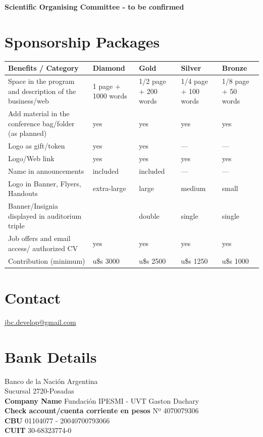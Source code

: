 \documentclass[11pt,a4paper]{report}
\begin{document}
\textbf{Scientific Organising Committee - to be confirmed}

\section*{Sponsorship Packages}
\begin{center}

\begin{tabular}{|p{4cm}|p{2.5cm}|p{2.5cm}|p{2.5cm}|p{2.5cm}|}
\hline
Benefits / Category & Diamond & Gold  & Silver & Bronze \\
\hline
Space in the program and description of the business/web & 1 page +
1000 words & 1/2 page + 200 words & 1/4 page + 100 words &  1/8 page +
50 words\\
\hline
Add material in the conference bag/folder (as planned) & yes & yes & yes & yes \\
\hline
Logo as gift/token & yes & yes & --- & --- \\
\hline
Logo/Web link  & yes & yes & yes & yes \\
\hline
Name in announcements & included & included & --- & --- \\
\hline
Logo in Banner, Flyers, Handouts & extra-large & large & medium & small \\
\hline
Banner/Insignia displayed in auditorium triple & & double & single & single \\
\hline
Job offers and email access/ authorized CV  & yes & yes & yes & yes \\
\hline
Contribution (minimum) & u\$s 3000 & u\$s 2500 & u\$s 1250 & u\$s 1000\\
\hline
\end{tabular}
\end{center}

\section*{Contact}
\noindent \href{mailto:jbc.develop@gmail.com}{jbc.develop@gmail.com}

\section*{Bank Details}
\noindent Banco de la Nación Argentina \\
Sucursal 2720-Posadas \\
\textbf{Company Name} Fundación IPESMI - UVT Gaston Dachary \\
\textbf{Check account/cuenta corriente en pesos} Nº 4070079306 \\
\textbf{CBU} 01104077 - 20040700793066 \\
\textbf{CUIT} 30-68323774-0 \\
\end{document}
